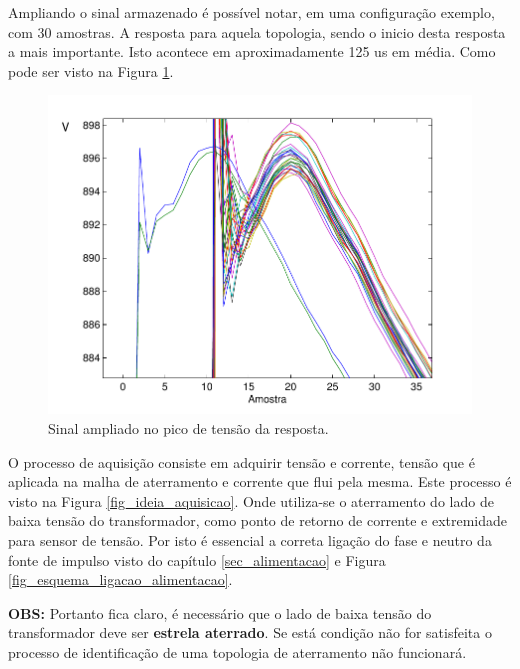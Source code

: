 \documentclass[a4paper, 10pt]{article}
\begin{document}
Ampliando o sinal armazenado é possível notar, em uma configuração exemplo, com 30
amostras. A resposta para aquela topologia, sendo o inicio desta resposta a mais 
importante. Isto acontece em aproximadamente 125 us em média. Como pode ser visto
na Figura \ref{fig_sinal_detalhe}.

\begin{figure}[!h]
    \caption{\label{fig_sinal_detalhe} Sinal ampliado no pico de tensão da resposta.}
	    \begin{center}
            \includegraphics[scale=0.5]{../fotos/sinal/sinal_detalhes-eps-converted-to.pdf}
	    \end{center}
\end{figure}

O processo de aquisição consiste em adquirir tensão e corrente, tensão 
que é aplicada na malha de aterramento e corrente que flui pela mesma. 
Este processo é visto na Figura \ref{fig_ideia_aquisicao}. Onde utiliza-se
o aterramento do lado de baixa tensão do transformador, como ponto de retorno
de corrente e extremidade para sensor de tensão. Por isto é essencial a 
correta ligação do fase e neutro da fonte de impulso visto do capítulo \ref{sec_alimentacao}
e Figura \ref{fig_esquema_ligacao_alimentacao}.

\textbf{OBS:} Portanto fica claro, é necessário que o lado de baixa tensão
do transformador deve ser \textbf{estrela aterrado}. Se está condição não for 
satisfeita o processo de identificação de uma topologia de aterramento não 
funcionará.
\end{document}
